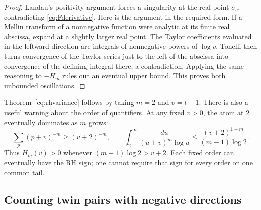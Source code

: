 \begin{proof}
Landau's positivity argument forces a singularity at the real point
\(\sigma_c\), contradicting \eqref{cq:Fderivative}. Here is the argument
in the required form. If a Mellin transform of a nonnegative function
were analytic at its finite real abscissa, expand at a slightly larger
real point. The Taylor coefficients evaluated in the leftward direction
are integrals of nonnegative powers of \(\log v\). Tonelli then turns
convergence of the Taylor series just to the left of the abscissa into
convergence of the defining integral there, a contradiction.
Applying the same reasoning to \(-H_m\) rules out an eventual upper bound.
This proves both unbounded oscillations.
\end{proof}

Theorem~\ref{cq:rhvariance} follows by taking \(m=2\) and \(v=t-1\).
There is also a useful warning about the order of quantifiers. At any fixed
\(v>0\), the atom at \(2\) eventually dominates as \(m\) grows:
\[
 \sum_p(p+v)^{-m}\geq(v+2)^{-m},\qquad
 \int_2^\infty\frac{du}{(u+v)^m\log u}
 \leq\frac{(v+2)^{1-m}}{(m-1)\log2}.
\]
Thus \(H_m(v)>0\) whenever \((m-1)\log2>v+2\). Each fixed order can
eventually have the RH sign; one cannot require that sign for every order
on one common tail.



\subsection{Counting twin pairs with negative directions}\label{app:twin-index}

